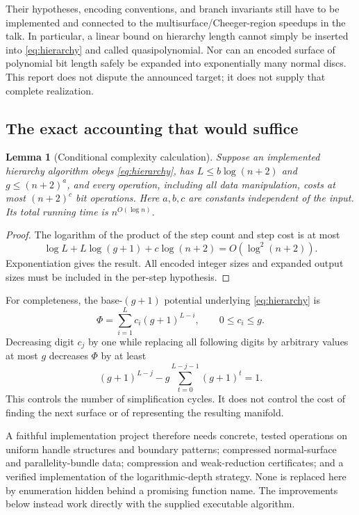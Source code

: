 \documentclass[11pt,a4paper]{article}
\newtheorem{lemma}[theorem]{Lemma}
\theoremstyle{definition}\newtheorem{remark}[theorem]{Remark}
\begin{document}
Their hypotheses, encoding conventions, and branch invariants still have to be
implemented and connected to the multisurface/Cheeger-region speedups in the
talk. In particular, a linear bound on hierarchy length cannot simply be inserted
into \eqref{eq:hierarchy} and called quasipolynomial. Nor can an encoded surface
of polynomial bit length safely be expanded into exponentially many normal discs.
This report does not dispute the announced target; it does not supply that
complete realization.

\subsection{The exact accounting that would suffice}
\begin{lemma}[Conditional complexity calculation]
Suppose an implemented hierarchy algorithm obeys \eqref{eq:hierarchy}, has
$L\le b\log(n+2)$ and $g\le(n+2)^a$, and every operation, including all data
manipulation, costs at most $(n+2)^c$ bit operations. Here $a,b,c$ are constants
independent of the input. Its total running time is $n^{O(\log n)}$.
\end{lemma}
\begin{proof}
The logarithm of the product of the step count and step cost is at most
\[
\log L+L\log(g+1)+c\log(n+2)=O(\log^2(n+2)).
\]
Exponentiation gives the result. All encoded integer sizes and expanded output
sizes must be included in the per-step hypothesis.
\end{proof}

For completeness, the base-$(g+1)$ potential underlying \eqref{eq:hierarchy} is
\[
\Phi=\sum_{i=1}^{L} c_i(g+1)^{L-i},\qquad 0\le c_i\le g.
\]
Decreasing digit $c_j$ by one while replacing all following digits by arbitrary
values at most $g$ decreases $\Phi$ by at least
\[
(g+1)^{L-j}-g\sum_{t=0}^{L-j-1}(g+1)^t=1.
\]
This controls the number of simplification cycles. It does not control the cost
of finding the next surface or of representing the resulting manifold.

A faithful implementation project therefore needs concrete, tested operations on
uniform handle structures and boundary patterns; compressed normal-surface and
parallelity-bundle data; compression and weak-reduction certificates; and a
verified implementation of the logarithmic-depth strategy. None is replaced here
by enumeration hidden behind a promising function name. The improvements below
instead work directly with the supplied executable algorithm.
\end{document}
